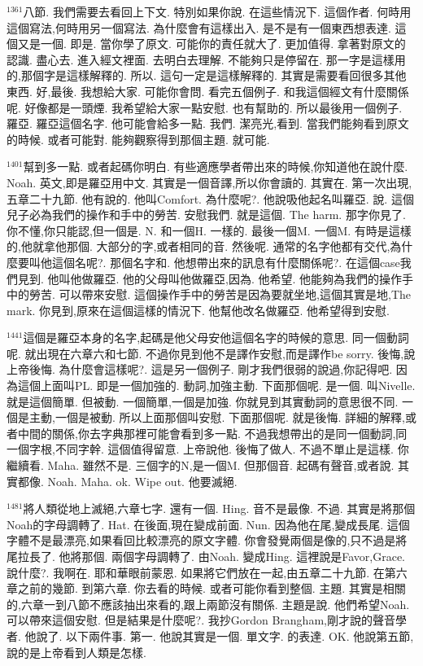 \documentclass{book}
\begin{document}
$^{1361}$八節.
我們需要去看回上下文.
特別如果你說.
在這些情況下.
這個作者.
何時用這個寫法,何時用另一個寫法.
為什麼會有這樣出入.
是不是有一個東西想表達.
這個又是一個.
即是.
當你學了原文.
可能你的責任就大了.
更加值得.
拿著對原文的認識.
盡心去.
進入經文裡面.
去明白去理解.
不能夠只是停留在.
那一字是這樣用的,那個字是這樣解釋的.
所以.
這句一定是這樣解釋的.
其實是需要看回很多其他東西.
好,最後.
我想給大家.
可能你會問.
看完五個例子.
和我這個經文有什麼關係呢.
好像都是一頭煙.
我希望給大家一點安慰.
也有幫助的.
所以最後用一個例子.
羅亞.
羅亞這個名字.
他可能會給多一點.
我們.
潔亮光,看到.
當我們能夠看到原文的時候.
或者可能對.
能夠觀察得到那個主題.
就可能.

$^{1401}$幫到多一點.
或者起碼你明白.
有些適應學者帶出來的時候,你知道他在說什麼.
Noah.
英文,即是羅亞用中文.
其實是一個音譯,所以你會讀的.
其實在.
第一次出現,五章二十九節.
他有說的.
他叫Comfort.
為什麼呢?.
他說吸他起名叫羅亞.
說.
這個兒子必為我們的操作和手中的勞苦.
安慰我們.
就是這個.
The harm.
那字你見了.
你不懂,你只能認,但一個是.
N.
和一個H.
一樣的.
最後一個M.
一個M.
有時是這樣的,他就拿他那個.
大部分的字,或者相同的音.
然後呢.
通常的名字他都有交代,為什麼要叫他這個名呢?.
那個名字和.
他想帶出來的訊息有什麼關係呢?.
在這個case我們見到.
他叫他做羅亞.
他的父母叫他做羅亞,因為.
他希望.
他能夠為我們的操作手中的勞苦.
可以帶來安慰.
這個操作手中的勞苦是因為要就坐地,這個其實是地,The mark.
你見到,原來在這個這樣的情況下.
他幫他改名做羅亞.
他希望得到安慰.

$^{1441}$這個是羅亞本身的名字,起碼是他父母安他這個名字的時候的意思.
同一個動詞呢.
就出現在六章六和七節.
不過你見到他不是譯作安慰,而是譯作be sorry.
後悔,說上帝後悔.
為什麼會這樣呢?.
這是另一個例子.
剛才我們很弱的說過,你記得吧.
因為這個上面叫PL.
即是一個加強的.
動詞,加強主動.
下面那個呢.
是一個.
叫Nivelle.
就是這個簡單.
但被動.
一個簡單,一個是加強.
你就見到其實動詞的意思很不同.
一個是主動,一個是被動.
所以上面那個叫安慰.
下面那個呢.
就是後悔.
詳細的解釋,或者中間的關係,你去字典那裡可能會看到多一點.
不過我想帶出的是同一個動詞,同一個字根,不同字幹.
這個值得留意.
上帝說他.
後悔了做人.
不過不單止是這樣.
你繼續看.
Maha.
雖然不是.
三個字的N,是一個M.
但那個音.
起碼有聲音,或者說.
其實都像.
Noah.
Maha.
ok.
Wipe out.
他要滅絕.

$^{1481}$將人類從地上滅絕,六章七字.
還有一個.
Hing.
音不是最像.
不過.
其實是將那個Noah的字母調轉了.
Hat.
在後面,現在變成前面.
Nun.
因為他在尾,變成長尾.
這個字體不是最漂亮,如果看回比較漂亮的原文字體.
你會發覺兩個是像的,只不過是將尾拉長了.
他將那個.
兩個字母調轉了.
由Noah.
變成Hing.
這裡說是Favor,Grace.
說什麼?.
我啊在.
耶和華眼前蒙恩.
如果將它們放在一起,由五章二十九節.
在第六章之前的幾節.
到第六章.
你去看的時候.
或者可能你看到整個.
主題.
其實是相關的,六章一到八節不應該抽出來看的,跟上兩節沒有關係.
主題是說.
他們希望Noah.
可以帶來這個安慰.
但是結果是什麼呢?.
我抄Gordon Brangham,剛才說的聲音學者.
他說了.
以下兩件事.
第一.
他說其實是一個.
單文字.
的表達.
OK.
他說第五節,說的是上帝看到人類是怎樣.
\end{document}
